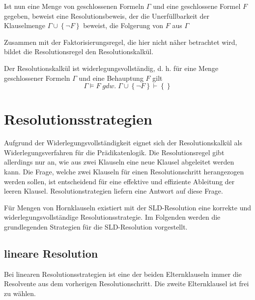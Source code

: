Ist nun eine Menge von geschlossenen Formeln $\Gamma$ und eine geschlossene Formel $F$ gegeben, beweist eine Resolutionsbeweis, der die Unerfüllbarkeit der Klauselmenge $\Gamma \cup \left \{ \neg F \right \}$ beweist, die Folgerung von $F$ aus $\Gamma$

Zusammen mit der Faktorisierungsregel, die hier nicht näher betrachtet wird, bildet die Resolutionsregel den Resolutionskalkül.

\begin{leftbar}
  \begin{satz}[Widerlegungsvollständigkeit]
    \newline
    Der Resolutionskalkül ist widerlegungsvollständig, d. h. für eine Menge geschlossener Formeln $\Gamma$ und eine Behauptung $F$ gilt
    \begin{equation}
      \Gamma \models F \; gdw.\; \Gamma \cup \left \{ \neg F \right \} \vdash \left \{ \right \}
    \end{equation}
\end{satz}
\end{leftbar}
\noindent

\section{Resolutionsstrategien}
Aufgrund der Widerlegungsvollständigkeit eignet sich der Resolutionskalkül als Widerlegungsverfahren für die Prädikatenlogik. Die Resolutionsregel gibt allerdings nur an, wie aus zwei Klauseln eine neue Klausel abgeleitet werden kann. Die Frage, welche zwei Klauseln für einen Resolutionschritt herangezogen werden sollen, ist entscheidend für eine effektive und effiziente Ableitung der leeren Klausel. Resolutionstrategien liefern eine Antwort auf diese Frage.

Für Mengen von Hornklauseln existiert mit der SLD-Resolution eine korrekte und widerlegungsvollständige Resolutionsstrategie.
Im Folgenden werden die grundlegenden Strategien für die SLD-Resolution vorgestellt.

\subsection{lineare Resolution}
Bei linearen Resolutionsstrategien ist eine der beiden Elternklauseln immer die Resolvente aus dem vorherigen Resolutionschritt. Die zweite Elternklausel ist frei zu wählen.

